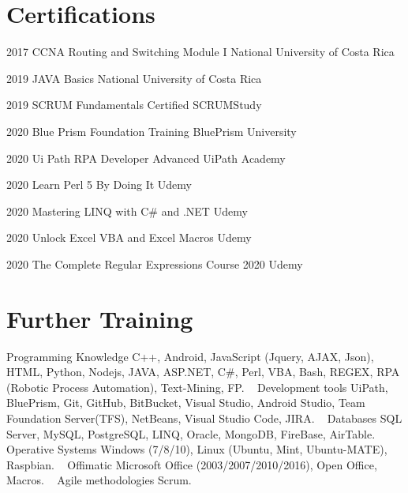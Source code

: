 \documentclass[]{friggeri-cv}
\begin{document}
\section{Certifications}
\begin{entrylist}
    \entry
    {\hspace{11mm}2017}
    {CCNA Routing and Switching Module I}
    {National University of Costa Rica}
    
    \entry
    {\hspace{11mm}2019}
    {JAVA Basics}
    {National University of Costa Rica}
    
    \entry
    {\hspace{11mm}2019}
    {SCRUM Fundamentals Certified}
    {SCRUMStudy}

    \entry
    {\hspace{11mm}2020}
    {Blue Prism Foundation Training}
    {BluePrism University}
    
    \entry
    {\hspace{11mm}2020}
    {Ui Path RPA Developer Advanced}
    {UiPath Academy}
    
    \entry
    {\hspace{11mm}2020}
    {Learn Perl 5 By Doing It}
    {Udemy}
    
\end{entrylist}

\newpage

\begin{entrylist}
    \entry
    {\hspace{11mm}2020}
    {Mastering LINQ with C# and .NET}
    {Udemy}

    \entry
    {\hspace{11mm}2020}
    {Unlock Excel VBA and Excel Macros}
    {Udemy}

    \entry
    {\hspace{11mm}2020}
    {The Complete Regular Expressions Course 2020}
    {Udemy}
    
\end{entrylist}

\section{Further Training}
\begin{entrylist}
    \entry
    {}
    {Programming Knowledge}
    {}
    {C++, Android, JavaScript (Jquery, AJAX, Json), HTML, Python, Nodejs, JAVA, ASP.NET, C\#, Perl, VBA, Bash, REGEX, RPA (Robotic Process Automation), Text-Mining, FP.}
    ~
    \entry
    {}
    {Development tools}
    {}
    {UiPath, BluePrism, Git, GitHub, BitBucket, Visual Studio, Android Studio, Team Foundation Server(TFS), NetBeans, Visual Studio Code, JIRA.}
    ~
    \entry
    {}
    {Databases}
    {}
    {SQL Server, MySQL, PostgreSQL, LINQ, Oracle, MongoDB, FireBase, AirTable.}
    ~
    \entry
    {}
    {Operative Systems}
    {}
    {Windows (7/8/10), Linux (Ubuntu, Mint, Ubuntu-MATE), Raspbian.}
    ~
    \entry
    {}
    {Offimatic}
    {}
    {Microsoft Office (2003/2007/2010/2016), Open Office, Macros.}
    ~
    \entry
    {}
    {Agile methodologies}
    {}
    {Scrum.}
    
\end{entrylist}
\end{document}
